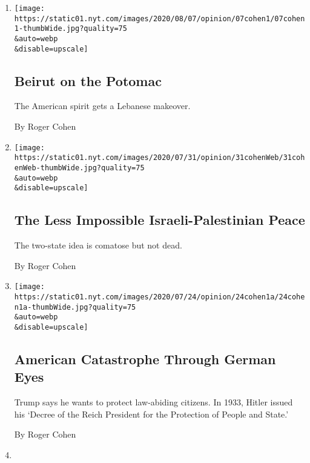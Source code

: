 \begin{enumerate}
\def\labelenumi{\arabic{enumi}.}
\item
  \href{/2020/08/07/opinion/beirut-explosion.html}{}

  \texttt{[image: https://static01.nyt.com/images/2020/08/07/opinion/07cohen1/07cohen1-thumbWide.jpg?quality=75\\\&auto=webp\\\&disable=upscale]}

  \hypertarget{beirut-on-the-potomac}{%
  \subsection{Beirut on the Potomac}\label{beirut-on-the-potomac}}

  The American spirit gets a Lebanese makeover.

  By Roger Cohen
\item
  \href{/2020/07/31/opinion/israeli-palestinian-peace.html}{}

  \texttt{[image: https://static01.nyt.com/images/2020/07/31/opinion/31cohenWeb/31cohenWeb-thumbWide.jpg?quality=75\\\&auto=webp\\\&disable=upscale]}

  \hypertarget{the-less-impossible-israeli-palestinian-peace}{%
  \subsection{The Less Impossible Israeli-Palestinian
  Peace}\label{the-less-impossible-israeli-palestinian-peace}}

  The two-state idea is comatose but not dead.

  By Roger Cohen
\item
  \href{/2020/07/24/opinion/trump-germany.html}{}

  \texttt{[image: https://static01.nyt.com/images/2020/07/24/opinion/24cohen1a/24cohen1a-thumbWide.jpg?quality=75\\\&auto=webp\\\&disable=upscale]}

  \hypertarget{american-catastrophe-through-german-eyes}{%
  \subsection{American Catastrophe Through German
  Eyes}\label{american-catastrophe-through-german-eyes}}

  Trump says he wants to protect law-abiding citizens. In 1933, Hitler
  issued his `Decree of the Reich President for the Protection of People
  and State.'

  By Roger Cohen
\item
  \href{/2020/07/17/opinion/france-america-thomas-jefferson-race.html}{}


\end{enumerate}
